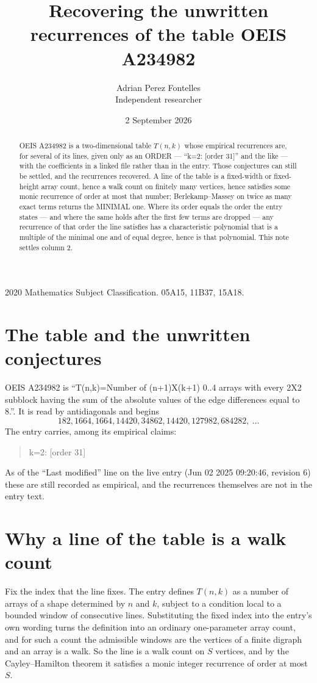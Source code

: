 \documentclass[11pt,a4paper]{article}
\title{Recovering the unwritten recurrences of the table OEIS A234982}
\author{Adrian Perez Fontelles\\ \small Independent researcher}
\date{2 September 2026}
\theoremstyle{plain}
\theoremstyle{definition}
\begin{document}
\maketitle

\begin{abstract}
OEIS A234982 is a two-dimensional table $T(n,k)$ whose empirical recurrences are, for several of
its lines, given only as an ORDER --- ``k=2: [order 31]'' and the like --- with the
coefficients in a linked file rather than in the entry. Those conjectures can still be settled,
and the recurrences recovered. A line of the table is a fixed-width or fixed-height array
count, hence a walk count on finitely many vertices, hence satisfies some monic recurrence of
order at most that number; Berlekamp--Massey on twice as many exact terms returns the MINIMAL
one. Where its order equals the order the entry states --- and where the same holds after the
first few terms are dropped --- any recurrence of that order the line satisfies has a
characteristic polynomial that is a multiple of the minimal one and of equal degree, hence is
that polynomial. This note settles column 2.
\end{abstract}

\noindent\small 2020 Mathematics Subject Classification. 05A15, 11B37, 15A18.\normalsize

\section{The table and the unwritten conjectures}

OEIS A234982 is ``T(n,k)=Number of (n+1)X(k+1) 0..4 arrays with every 2X2 subblock having the sum of the absolute values of the edge differences equal to 8.''. It is read by antidiagonals and begins
\[
182, 1664, 1664, 14420, 34862, 14420, 127982, 684282,\ \dots
\]
The entry carries, among its empirical claims:
\begin{quote}\small
k=2: [order 31]
\end{quote}
As of the ``Last modified'' line on the live entry (Jun 02 2025 09:20:46, revision 6) these are still
recorded as empirical, and the recurrences themselves are not in the entry text.

\section{Why a line of the table is a walk count}

Fix the index that the line fixes. The entry defines $T(n,k)$ as a number of arrays of a shape
determined by $n$ and $k$, subject to a condition local to a bounded window of consecutive
lines. Substituting the fixed index into the entry's own wording turns the definition into an
ordinary one-parameter array count, and for such a count the admissible windows are the
vertices of a finite digraph and an array is a walk. So the line is a walk count on $S$
vertices, and by the Cayley--Hamilton theorem it satisfies a monic integer recurrence of order
at most $S$.
\end{document}
